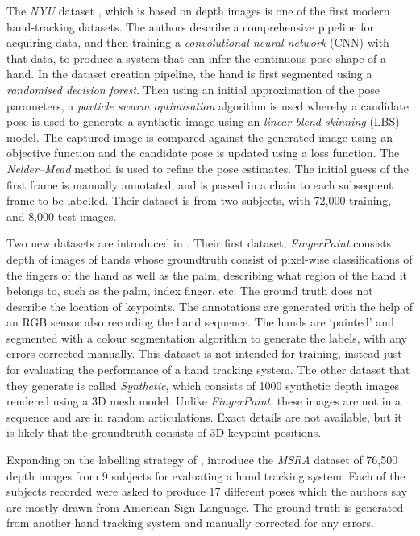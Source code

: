 The {\slshape NYU} dataset \cite{tompson2014real}, which is based on depth images is one of the first modern hand-tracking datasets. The authors describe a comprehensive pipeline for acquiring data, and then training a {\slshape convolutional neural network} (CNN) with that data, to produce a system that can infer the continuous pose shape of a hand. In the dataset creation pipeline, the hand is first segmented using a {\slshape randomised decision forest}. Then using an initial approximation of the pose parameters, a {\slshape particle swarm optimisation} algorithm is used whereby a candidate pose is used to generate a synthetic image using an {\slshape linear blend skinning} (LBS) model. The captured image is compared against the generated image using an objective function and the candidate pose is updated using a loss function. The {\slshape Nelder–Mead} method is used to refine the pose estimates. The initial guess of the first frame is manually annotated, and is passed in a chain to each subsequent frame to be labelled. Their dataset is from two subjects, with 72,000 training, and 8,000 test images.

Two new datasets are introduced in \cite{sharp2015accurate}. Their first dataset, {\slshape FingerPaint} consists depth of images of hands whose groundtruth consist of pixel-wise classifications of the fingers of the hand as well as the palm, describing what region of the hand it belongs to, such as the palm, index finger, etc. The ground truth does not describe the location of keypoints. The annotations are generated with the help of an RGB sensor also recording the hand sequence. The hands are `painted' and segmented with a colour segmentation algorithm to generate the labels, with any errors corrected manually. This dataset is not intended for training, instead just for evaluating the performance of a hand tracking system. The other dataset that they generate is called {\slshape Synthetic}, which consists of 1000 synthetic depth images rendered using a 3D mesh model. Unlike {\slshape FingerPaint}, these images are not in a sequence and are in random articulations. Exact details are not available, but it is likely that the groundtruth consists of 3D keypoint positions.

Expanding on the labelling strategy of \cite{tompson2014real}, \cite{sun2015cascaded} introduce the {\slshape MSRA} dataset of 76,500 depth images from 9 subjects for evaluating a hand tracking system. Each of the subjects recorded were asked to produce 17 different poses which the authors say are mostly drawn from American Sign Language. The ground truth is generated from another hand tracking system and manually corrected for any errors.

